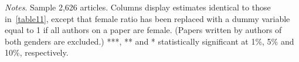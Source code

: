 \begin{table}
\begin{adjustwidth}{-0.085cm}{}
\begin{threeparttable}
\begin{tabular}{p{2.64cm}SSSSSSS}
            \bottomrule
        \end{tabular}
        \begin{tablenotes}
            \tiny
            \item \textit{Notes}. Sample 2,626 articles. Columns display estimates identical to those in~\autoref{table11}, except that female ratio has been replaced with a dummy variable equal to 1 if all authors on a paper are female. (Papers written by authors of both genders are excluded.) ***, ** and * statistically significant at 1\%, 5\% and 10\%, respectively.
        \end{tablenotes}
    \end{threeparttable}
    \end{adjustwidth}
\end{table}